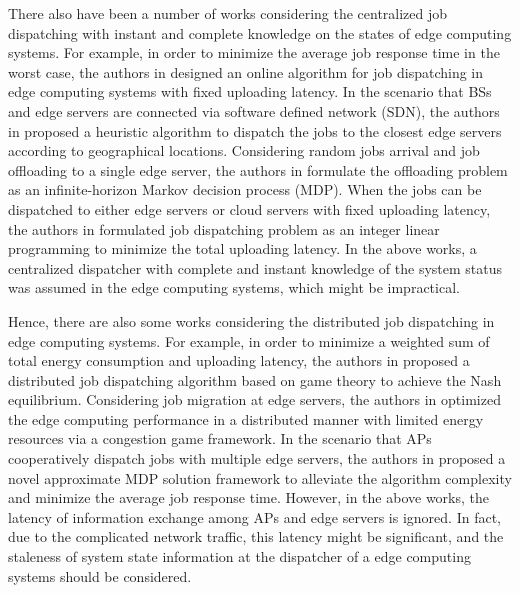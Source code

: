 There also have been a number of works considering the centralized job dispatching with instant and complete knowledge on the states of edge computing systems.
For example, in order to minimize the average job response time in the worst case, the authors in \cite{tan-online} designed an online algorithm for job dispatching in edge computing systems with fixed uploading latency.
In the scenario that BSs and edge servers are connected via software defined network (SDN), the authors in \cite{IOTJ18-FanQ} proposed a heuristic algorithm to dispatch the jobs to the closest edge servers according to geographical locations.
Considering random jobs arrival and job offloading to a single edge server, the authors in \cite{mdp-globecom,mdp-tvt} formulate the offloading problem as an infinite-horizon Markov decision process (MDP).
When the jobs can be dispatched to either edge servers or cloud servers with fixed uploading latency, the authors in \cite{MASS18-MengZ} formulated job dispatching problem as an integer linear programming to minimize the total uploading latency.
In the above works, a centralized dispatcher with complete and instant knowledge of the system status was assumed in the edge computing systems, which might be impractical.

Hence, there are also some works considering the distributed job dispatching in edge computing systems.
For example, in order to minimize a weighted sum of total energy consumption and uploading latency, the authors in \cite{ToN-Xuchen2016} proposed a distributed job dispatching algorithm based on game theory to achieve the Nash equilibrium. 
Considering job migration at edge servers, the authors in \cite{ToN-xujie2018} optimized the edge computing performance in a distributed manner with limited energy resources via a congestion game framework.
In the scenario that APs cooperatively dispatch jobs with multiple edge servers, the authors in \cite{mdp-jcin} proposed a novel approximate MDP solution framework to alleviate the algorithm complexity and minimize the average job response time.
However, in the above works, the latency of information exchange among APs and edge servers is ignored.
In fact, due to the complicated network traffic, this latency might be significant, and the staleness of system state information at the dispatcher of a edge computing systems should be considered.

